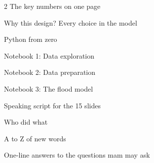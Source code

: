 \documentclass[9pt,a4paper]{extarticle}
\begin{document}
{\begin{multicols}{2}
\noindent\makebox[1.3em][l]{\ref{ch:nums}}The key numbers on one page\dotfill\pageref{ch:nums}\par
\noindent\makebox[1.3em][l]{\ref{ch:design}}Why this design? Every choice in the model\dotfill\pageref{ch:design}\par
\noindent\makebox[1.3em][l]{\ref{ch:python}}Python from zero\dotfill\pageref{ch:python}\par
\noindent\makebox[1.3em][l]{\ref{ch:nb-explore}}Notebook 1: Data exploration\dotfill\pageref{ch:nb-explore}\par
\noindent\makebox[1.3em][l]{\ref{ch:nb-prep}}Notebook 2: Data preparation\dotfill\pageref{ch:nb-prep}\par
\noindent\makebox[1.3em][l]{\ref{ch:nb-model}}Notebook 3: The flood model\dotfill\pageref{ch:nb-model}\par
\noindent\makebox[1.3em][l]{\ref{ch:script}}Speaking script for the 15 slides\dotfill\pageref{ch:script}\par
\noindent\makebox[1.3em][l]{\ref{ch:who}}Who did what\dotfill\pageref{ch:who}\par
\noindent\makebox[1.3em][l]{\ref{ch:gloss}}A to Z of new words\dotfill\pageref{ch:gloss}\par
\noindent\makebox[1.3em][l]{\ref{ch:viva}}One-line answers to the questions mam may ask\dotfill\pageref{ch:viva}\par
\end{multicols}}
\setcounter{section}{-1}

\setcounter{section}{0}











\end{document}
